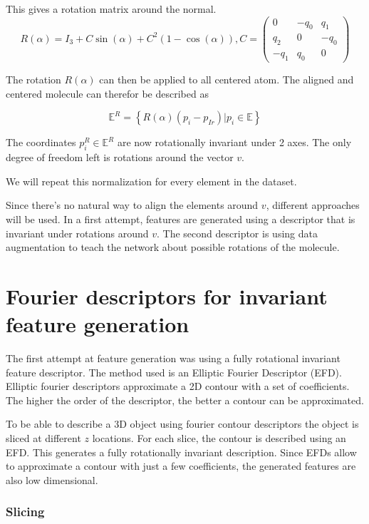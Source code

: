 This gives a rotation matrix around the normal.
$$
R(\alpha) = I_3 + C \sin(\alpha) + C^2(1 - \cos(\alpha)), C =
\begin{pmatrix}
  0 & -q_0 & q_1 \\
  q_2 & 0 & -q_0\\
  -q_1 & q_0 & 0
\end{pmatrix}
$$


The rotation $R(\alpha)$ can then be applied to all centered atom.
The aligned and centered molecule can therefor be described as

$$ 
\mathbb{E}^R = \left\{ R(\alpha) (p_i - p_{Ir}) |  p_i \in \mathbb{E} \right\}
$$

The coordinates $p^R_i \in \mathbb{E}^R$ are now rotationally invariant under 2 axes. 
The only degree of freedom left is rotations around the vector $v$. 

We will repeat this normalization for every element in the dataset.

Since there's no natural way to align the elements around $v$, different approaches will be used.
In a first attempt, features are generated using a descriptor that is invariant under rotations around $v$.
The second descriptor is using data augmentation to teach the network about possible rotations of the molecule.

\section{Fourier descriptors for invariant feature generation}

The first attempt at feature generation was using a fully rotational invariant feature descriptor.
The method used is an Elliptic Fourier Descriptor (EFD).
Elliptic fourier descriptors approximate a 2D contour with a set of coefficients.
The higher the order of the descriptor, the better a contour can be approximated.

To be able to describe a 3D object using fourier contour descriptors the object is sliced at different $z$ locations.
For each slice, the contour is described using an EFD.
This generates a fully rotationally invariant description.
Since EFDs allow to approximate a contour with just a few coefficients, the generated features
are also low dimensional.

\subsubsection{Slicing}

